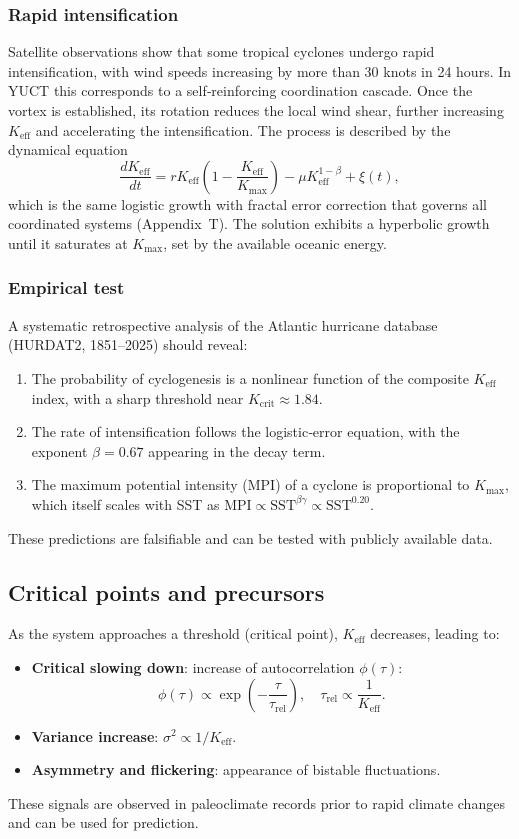 \documentclass[12pt,a4paper]{article}
\newcommand{\Keff}{K_{\mathrm{eff}}}
\begin{document}
\subsubsection*{Rapid intensification}

Satellite observations show that some tropical cyclones undergo rapid
intensification, with wind speeds increasing by more than 30 knots in 24 hours.
In YUCT this corresponds to a self‑reinforcing coordination cascade.  Once the
vortex is established, its rotation reduces the local wind shear, further
increasing $\Keff$ and accelerating the intensification.  The process is
described by the dynamical equation
\[
\frac{d\Keff}{dt} = r \Keff \left( 1 - \frac{\Keff}{K_{\max}} \right)
- \mu \Keff^{1-\beta} + \xi(t),
\]
which is the same logistic growth with fractal error correction that governs
all coordinated systems (Appendix~T).  The solution exhibits a hyperbolic growth
until it saturates at $K_{\max}$, set by the available oceanic energy.

\subsubsection*{Empirical test}

A systematic retrospective analysis of the Atlantic hurricane database (HURDAT2,
1851--2025) should reveal:
\begin{enumerate}
	\item The probability of cyclogenesis is a nonlinear function of the composite
	$\Keff$ index, with a sharp threshold near $K_{\mathrm{crit}} \approx 1.84$.
	\item The rate of intensification follows the logistic‑error equation, with
	the exponent $\beta = 0.67$ appearing in the decay term.
	\item The maximum potential intensity (MPI) of a cyclone is proportional to
	$K_{\mathrm{max}}$, which itself scales with SST as
	$\mathrm{MPI} \propto \mathrm{SST}^{\beta\gamma} \propto \mathrm{SST}^{0.20}$.
\end{enumerate}
These predictions are falsifiable and can be tested with publicly available data.

	\subsection{Critical points and precursors}
	
	As the system approaches a threshold (critical point), \(\Keff\) decreases, leading to:
	\begin{itemize}
		\item \textbf{Critical slowing down}: increase of autocorrelation \(\phi(\tau)\):
		\[
		\phi(\tau) \propto \exp\!\left(-\frac{\tau}{\tau_{\text{rel}}}\right),\quad \tau_{\text{rel}} \propto \frac{1}{\Keff}.
		\]
		\item \textbf{Variance increase}: \(\sigma^2 \propto 1/\Keff\).
		\item \textbf{Asymmetry and flickering}: appearance of bistable fluctuations.
	\end{itemize}
	These signals are observed in paleoclimate records prior to rapid climate changes and can be used for prediction.
	
\end{document}
